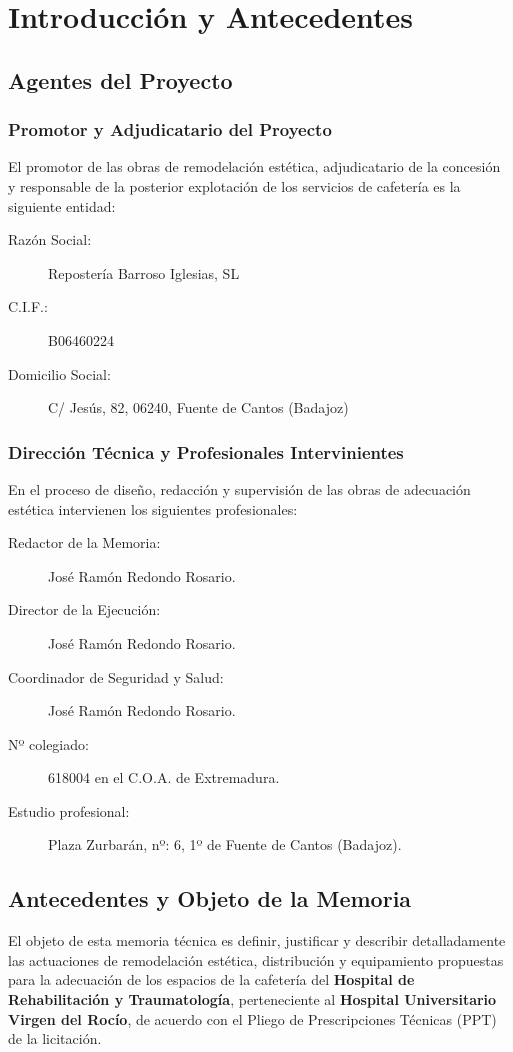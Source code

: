 \section{Introducción y Antecedentes}

\subsection{Agentes del Proyecto}

\subsubsection{Promotor y Adjudicatario del Proyecto}
El promotor de las obras de remodelación estética, adjudicatario de la concesión y responsable de la posterior explotación de los servicios de cafetería es la siguiente entidad:
\begin{description}
    \item[Razón Social:] Repostería Barroso Iglesias, SL
    \item[C.I.F.:] B06460224
    \item[Domicilio Social:] C/ Jesús, 82, 06240, Fuente de Cantos (Badajoz)
\end{description}

\subsubsection{Dirección Técnica y Profesionales Intervinientes}
En el proceso de diseño, redacción y supervisión de las obras de adecuación estética intervienen los siguientes profesionales:
\begin{description}
    \item[Redactor de la Memoria:] José Ramón Redondo Rosario.
    \item[Director de la Ejecución:] José Ramón Redondo Rosario.
    \item[Coordinador de Seguridad y Salud:] José Ramón Redondo Rosario.
    \item[Nº colegiado:] 618004 en el C.O.A. de Extremadura.
    \item[Estudio profesional:] Plaza Zurbarán, nº: 6, 1º de Fuente de Cantos (Badajoz).
\end{description}

\subsection{Antecedentes y Objeto de la Memoria}
El objeto de esta memoria técnica es definir, justificar y describir detalladamente las actuaciones de remodelación estética, distribución y equipamiento propuestas para la adecuación de los espacios de la cafetería del \textbf{Hospital de Rehabilitación y Traumatología}, perteneciente al \textbf{Hospital Universitario Virgen del Rocío}, de acuerdo con el Pliego de Prescripciones Técnicas (PPT) de la licitación.

